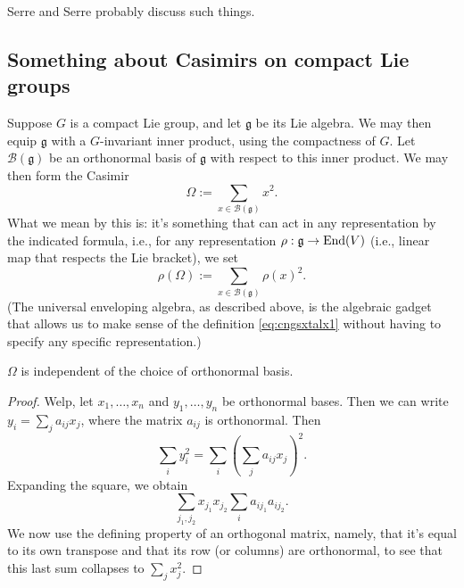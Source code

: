 \documentclass[reqno]{amsart} 
\begin{document}
Serre \cite{MR1808366} and Serre \cite{MR2179691} probably discuss such things.

\subsection{Something about Casimirs on compact Lie groups}\label{sec:cngsxurggj}
Suppose $G$ is a compact Lie group, and let $\mathfrak{g}$ be its Lie algebra.  We may then equip $\mathfrak{g}$ with a $G$-invariant inner product, using the compactness of $G$.  Let $\mathcal{B}(\mathfrak{g})$ be an orthonormal basis of $\mathfrak{g}$ with respect to this inner product.  We may then form the Casimir
\begin{equation}\label{eq:cngsxtalx1}
  \Omega := \sum_{x \in \mathcal{B}(\mathfrak{g})} x^2.
\end{equation}
What we mean by this is: it's something that can act in any representation by the indicated formula, i.e., for any representation $\rho : \mathfrak{g} \rightarrow \operatorname{End}(V)$ (i.e., linear map that respects the Lie bracket), we set
\begin{equation*}
  \rho(\Omega) := \sum_{x \in \mathcal{B}(\mathfrak{g})} \rho(x)^2.
\end{equation*}
(The universal enveloping algebra, as described above, is the algebraic gadget that allows us to make sense of the definition \eqref{eq:cngsxtalx1} without having to specify any specific representation.)

\begin{fact}\label{fact:cngsxurkz3}
  $\Omega$ is independent of the choice of orthonormal basis.
\end{fact}
\begin{proof}
  Welp, let $x_1, \dotsc, x_n$ and $y_1, \dotsc, y_n$ be orthonormal bases.  Then we can write $y_i = \sum_j a_{i j} x_j$, where the matrix $a_{i j}$ is orthonormal.  Then
  \begin{equation*}
    \sum_{i} y_i^2 = \sum_i \left( \sum_j a_{i j} x_j \right)^2.
  \end{equation*}
  Expanding the square, we obtain
  \begin{equation*}
    \sum_{j_1, j_2} x_{j_1} x_{j_2} \sum_i a_{i j_1} a_{i j_2}.
  \end{equation*}
  We now use the defining property of an orthogonal matrix, namely, that it's equal to its own transpose and that its row (or columns) are orthonormal, to see that this last sum collapses to $\sum_j x_j^2$.
\end{proof}
\end{document}
